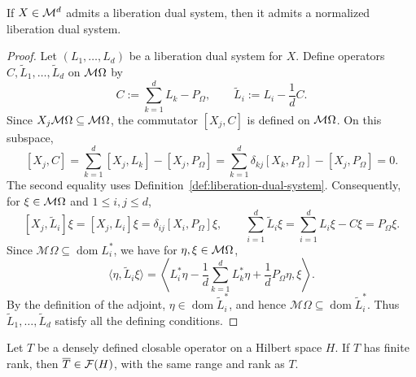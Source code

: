 \begin{proposition}\label{prop:liberation-normalization}
If $X\in\mathcal M^d$ admits a liberation dual system, then it admits a normalized liberation dual system.
\end{proposition}
\begin{proof}
Let $(L_1,\ldots,L_d)$ be a liberation dual system for $X$.
Define operators $C,\widetilde L_1,\ldots,\widetilde L_d$ on $\mathcal M\Omega$ by
\[
 C:=\sum_{k=1}^dL_k-P_\Omega,
 \qquad \widetilde L_i:=L_i-\frac1dC.
\]
Since $X_j\mathcal M\Omega\subseteq\mathcal M\Omega$, the commutator $[X_j,C]$ is defined on $\mathcal M\Omega$.
On this subspace,
\[
 [X_j,C]
 =\sum_{k=1}^d[X_j,L_k]-[X_j,P_\Omega]
 =\sum_{k=1}^d\delta_{kj}[X_k,P_\Omega]-[X_j,P_\Omega]
 =0.
\]
The second equality uses Definition~\ref{def:liberation-dual-system}.
Consequently, for $\xi\in\mathcal M\Omega$ and $1\leq i,j\leq d$,
\[
 [X_j,\widetilde L_i]\xi
 =[X_j,L_i]\xi=\delta_{ij}[X_i,P_\Omega]\xi,
 \qquad
 \sum_{i=1}^d\widetilde L_i\xi
 =\sum_{i=1}^dL_i\xi-C\xi
 =P_\Omega\xi.
\]
Since $\mathcal M\Omega\subseteq\operatorname{dom}L_i^*$, we have for $\eta,\xi\in\mathcal M\Omega$,
\[
 \langle\eta,\widetilde L_i\xi\rangle
 =\left\langle
 L_i^*\eta-\frac1d\sum_{k=1}^dL_k^*\eta+\frac1dP_\Omega\eta,
 \xi\right\rangle.
\]
By the definition of the adjoint, \(\eta\in\operatorname{dom}\widetilde L_i^*\), and hence \(\mathcal M\Omega\subseteq\operatorname{dom}\widetilde L_i^*\).
Thus \(\widetilde L_1,\ldots,\widetilde L_d\) satisfy all the defining conditions.
\end{proof}

\begin{lemma}\label{lem:finite-closure}
Let \(T\) be a densely defined closable operator on a Hilbert space \(H\).
If \(T\) has finite rank, then \(\overline T\in\mathcal F(H)\), with the same range and rank as \(T\).
\end{lemma}


